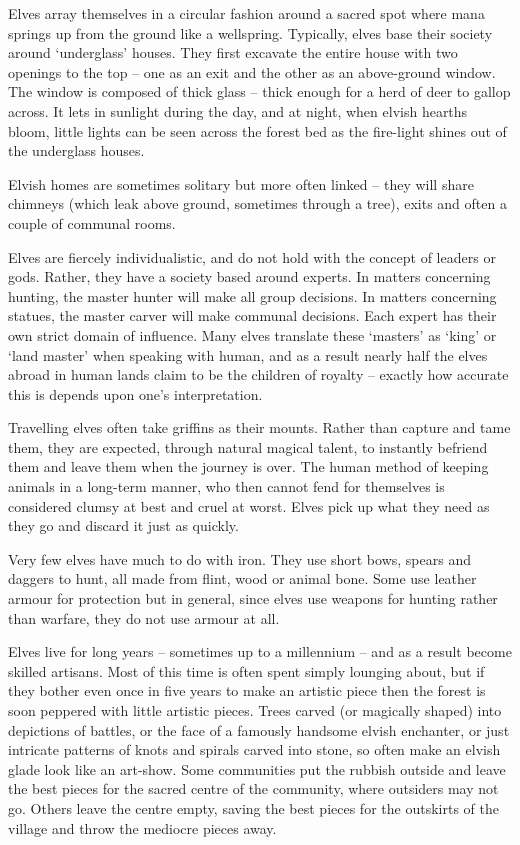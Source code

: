 \begin{multicols}{2}

\noindent
Elves array themselves in a circular fashion around a sacred spot where mana springs up from the ground like a wellspring.
Typically, elves base their society around `underglass' houses.
They first excavate the entire house with two openings to the top -- one as an exit and the other as an above-ground window.
The window is composed of thick glass -- thick enough for a herd of deer to gallop across.
It lets in sunlight during the day, and at night, when elvish hearths bloom, little lights can be seen across the forest bed as the fire-light shines out of the underglass houses.

Elvish homes are sometimes solitary but more often linked -- they will share chimneys (which leak above ground, sometimes through a tree), exits and often a couple of communal rooms.

Elves are fiercely individualistic, and do not hold with the concept of leaders or gods. Rather, they have a society based around experts. In matters concerning hunting, the master hunter will make all group decisions. In matters concerning statues, the master carver will make communal decisions. Each expert has their own strict domain of influence. Many elves translate these `masters' as `king' or `land master' when speaking with human, and as a result nearly half the elves abroad in human lands claim to be the children of royalty -- exactly how accurate this is depends upon one's interpretation.

Travelling elves often take griffins as their mounts. Rather than capture and tame them, they are expected, through natural magical talent, to instantly befriend them and leave them when the journey is over. The human method of keeping animals in a long-term manner, who then cannot fend for themselves is considered clumsy at best and cruel at worst. Elves pick up what they need as they go and discard it just as quickly.

Very few elves have much to do with iron. They use short bows, spears and daggers to hunt, all made from flint, wood or animal bone. Some use leather armour for protection but in general, since elves use weapons for hunting rather than warfare, they do not use armour at all.

Elves live for long years -- sometimes up to a millennium -- and as a result become skilled artisans.
Most of this time is often spent simply lounging about, but if they bother even once in five years to make an artistic piece then the forest is soon peppered with little artistic pieces.
Trees carved (or magically shaped) into depictions of battles, or the face of a famously handsome elvish enchanter, or just intricate patterns of knots and spirals carved into stone, so often make an elvish glade look like an art-show.
Some communities put the rubbish outside and leave the best pieces for the sacred centre of the community, where outsiders may not go.
Others leave the centre empty, saving the best pieces for the outskirts of the village and throw the mediocre pieces away.


\end{multicols}
